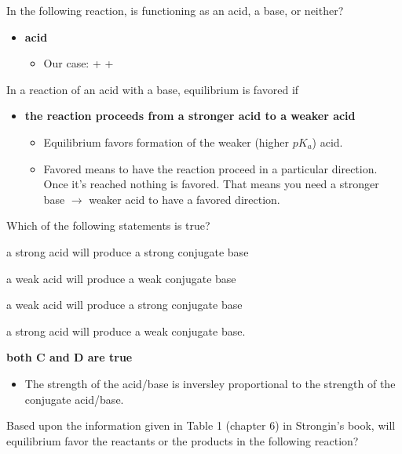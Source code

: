 \documentclass[12pt,a4paper]{article}
\begin{document}
\begin{enumerate}
\begin{itemize}
\begin{itemize}
                \end{itemize}
        \end{itemize}
    {\color{G-Moon}\item In the following reaction, is  functioning as an acid, a base, or neither?}
        \begin{itemize}
            \item {\color{o-Sun}\textbf{acid}}
                \begin{itemize}
                    \item Our case: {\color{neg}} + {\color{pos}} \ch{<>} {\color{pos}} + {\color{neg}}
                \end{itemize}
        \end{itemize}
    {\color{G-Moon}\item In a reaction of an acid with a base, equilibrium is favored if}
        \begin{itemize}
            \item {\color{o-Sun}\textbf{the reaction proceeds from a stronger acid to a weaker acid}}
                \begin{itemize}
                    \item Equilibrium {\color{o-Sun}favors formation} of the {\color{o-Sun} weaker} (higher \(pK_a\)) {\color{o-Sun}acid}.
                    \item Favored means to have the reaction proceed in a particular direction. Once it's reached nothing is favored. That means you need a stronger base $\rightarrow$ weaker acid to have a favored direction.
                \end{itemize}
        \end{itemize}
    \newpage
    {\color{G-Moon}\item Which of the following statements is true?}
        \begin{itemize}
            {\color{G-Moon}\item[A.] a strong acid will produce a strong conjugate base
            \item[B.] a weak acid will produce a weak conjugate base
            \item[C.] a weak acid will produce a strong conjugate base
            \item[D.] a strong acid will produce a weak conjugate base.}
            \item {\color{o-Sun}\textbf{both C and D are true}}
                \begin{itemize}
                    \item The strength of the acid/base is {\color{o-Sun}inversley proportional} to the strength of the conjugate acid/base.
                \end{itemize}
        \end{itemize}
    {\color{G-Moon}\item Based upon the information given in Table 1 (chapter 6) in Strongin's book, will equilibrium favor the reactants or the products in the following reaction?
    
}
\end{enumerate}
\end{document}
